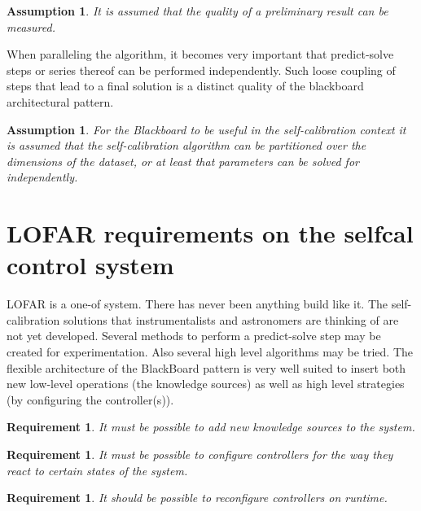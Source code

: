 \documentclass[]{lofar}
\newcounter{reqnum}
\newcounter{assnum}
\newtheorem{requirement}[reqnum]{Requirement}
\newtheorem{assumption}[assnum]{Assumption}
\begin{document}
    \begin{assumption}
      It is assumed that the quality of a preliminary result can be
      measured.
      \label{ass:quality}
    \end{assumption}

    When paralleling the algorithm, it becomes very important that
    predict-solve steps or series thereof can be performed
    independently. Such loose coupling of steps that lead to a final
    solution is a distinct quality of the blackboard architectural
    pattern.

    \begin{assumption}
      For the Blackboard to be useful in the self-calibration context
      it is assumed that the self-calibration algorithm can be
      partitioned over the dimensions of the dataset, or at least that
      parameters can be solved for independently.
      \label{ass:partitionable}
    \end{assumption}

  \section{LOFAR requirements on the selfcal control system}
  \label{sec:LOFAR-requirements}\hypertarget{sec:LOFAR-requirements}{}%

    LOFAR is a one-of system. There has never been anything build like
    it. The self-calibration solutions that instrumentalists and
    astronomers are thinking of are not yet developed. Several methods
    to perform a predict-solve step may be created for
    experimentation. Also several high level algorithms may be
    tried. The flexible architecture of the BlackBoard pattern is very
    well suited to insert both new low-level operations (the knowledge
    sources) as well as high level strategies (by configuring the
    controller(s)).

    \begin{requirement}
      It must be possible to add new knowledge sources to the system.
      \label{req:knowledge-sources}
    \end{requirement}

    \begin{requirement}
      It must be possible to configure controllers for the way they
      react to certain states of the system.
      \label{req:configure-controllers}
    \end{requirement}

    \begin{requirement}
      It should be possible to reconfigure controllers on runtime.
      \label{req:reconfigure-controllers}
    \end{requirement}
\end{document}
